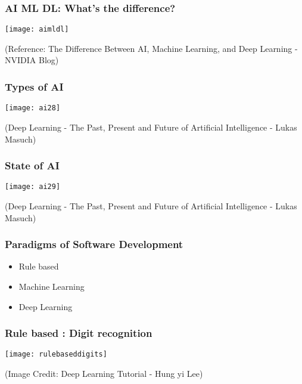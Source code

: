 \begin{frame}[fragile] \frametitle{AI ML DL: What's the difference?}
\begin{center}
\texttt{[image: aimldl]}
\end{center}
\tiny{(Reference: The Difference Between AI, Machine Learning, and Deep Learning - NVIDIA Blog)}
\end{frame}

\begin{frame}[fragile] \frametitle{Types of AI}
\begin{center}
\texttt{[image: ai28]}
\end{center}
{\tiny (Deep Learning - The Past, Present and Future of Artificial Intelligence - Lukas Masuch)}
\end{frame}

\begin{frame}[fragile] \frametitle{State of AI}
\begin{center}
\texttt{[image: ai29]}
\end{center}
{\tiny (Deep Learning - The Past, Present and Future of Artificial Intelligence - Lukas Masuch)}
\end{frame}


\begin{frame}[fragile] \frametitle{Paradigms of Software Development}

\begin{itemize}
\item Rule based
\item Machine Learning
\item Deep Learning

\end{itemize}

\end{frame}


\begin{frame}[fragile] \frametitle{Rule based : Digit recognition}
\begin{center}
\texttt{[image: rulebaseddigits]}
\end{center}

{\tiny (Image Credit: Deep Learning Tutorial - Hung yi Lee)}


\end{frame}

